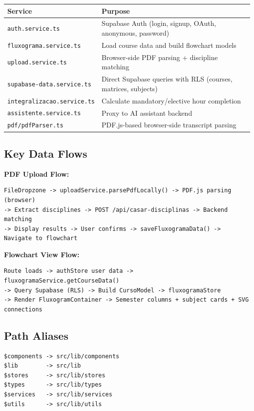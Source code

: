 \documentclass[11pt,a4paper]{article}
\newcommand{\code}[1]{\texttt{#1}}
\begin{document}
\begin{center}
\begin{longtable}{@{}L{4.8cm}L{8cm}@{}}
\toprule
\textbf{Service} & \textbf{Purpose} \\
\midrule
\endhead
\code{auth.service.ts}            & Supabase Auth (login, signup, OAuth, anonymous, password) \\
\code{fluxograma.service.ts}      & Load course data and build flowchart models \\
\code{upload.service.ts}          & Browser-side PDF parsing + discipline matching \\
\code{supabase-data.service.ts}   & Direct Supabase queries with RLS (courses, matrices, subjects) \\
\code{integralizacao.service.ts}  & Calculate mandatory/elective hour completion \\
\code{assistente.service.ts}      & Proxy to AI assistant backend \\
\code{pdf/pdfParser.ts}           & PDF.js-based browser-side transcript parsing \\
\bottomrule
\end{longtable}
\end{center}

\subsection{Key Data Flows}

\noindent\textbf{PDF Upload Flow:}
\begin{lstlisting}
FileDropzone -> uploadService.parsePdfLocally() -> PDF.js parsing (browser)
-> Extract disciplines -> POST /api/casar-disciplinas -> Backend matching
-> Display results -> User confirms -> saveFluxogramaData() -> Navigate to flowchart
\end{lstlisting}

\noindent\textbf{Flowchart View Flow:}
\begin{lstlisting}
Route loads -> authStore user data -> fluxogramaService.getCourseData()
-> Query Supabase (RLS) -> Build CursoModel -> fluxogramaStore
-> Render FluxogramContainer -> Semester columns + subject cards + SVG connections
\end{lstlisting}

\subsection{Path Aliases}

\begin{lstlisting}
$components -> src/lib/components
$lib        -> src/lib
$stores     -> src/lib/stores
$types      -> src/lib/types
$services   -> src/lib/services
$utils      -> src/lib/utils
\end{lstlisting}
\end{document}
